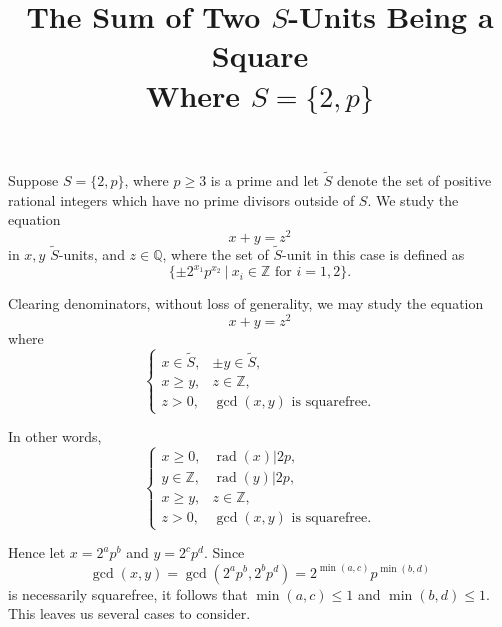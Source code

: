 \documentclass[11pt]{article}
\title{The Sum of Two $S$-Units Being a Square \\ 
	Where $S = \{2,p\}$}
\author{}
\theoremstyle{definition}
\DeclareMathOperator{\rad}{rad}
\begin{document}
\maketitle


Suppose $S = \{2,p\}$, where $p \geq 3$ is a prime and let $\tilde{S}$ denote the set of positive rational integers which have no prime divisors outside of $S$. We study the equation
\[x + y = z^2\]
in $x,y$ $\tilde{S}$-units, and $z \in \mathbb{Q}$, where the set of $\tilde{S}$-unit in this case is defined as
\[\{ \pm 2^{x_1}p^{x_2} \ | \ x_i \in \mathbb{Z} \text{ for } i = 1, 2\}.\]

Clearing denominators, without loss of generality, we may study the equation 
\[x + y = z^2\]
where 
\[\begin{cases}
x \in \tilde{S}, & \pm y \in \tilde{S}, \\
x \geq y, & z \in \mathbb{Z}, \\
z > 0, & \gcd(x,y) \text{ is squarefree}.
\end{cases}\]

In other words, 
\[\begin{cases}
x \geq 0, & \rad(x) | 2p, \\
y \in \mathbb{Z}, & \rad(y) | 2p, \\
x \geq y, & z \in \mathbb{Z}, \\
z > 0, & \gcd(x,y) \text{ is squarefree}.
\end{cases}\]

Hence let $x = 2^{a}p^b$ and $y = 2^{c}p^d$. Since
\[ \gcd(x,y) = \gcd(2^ap^b, 2^bp^d) = 2^{\min(a,c)}p^{\min(b,d)}\]
is necessarily squarefree, it follows that $\min(a,c) \leq 1$ and $\min(b,d) \leq 1$. This leaves us several cases to consider. 
\end{document}
